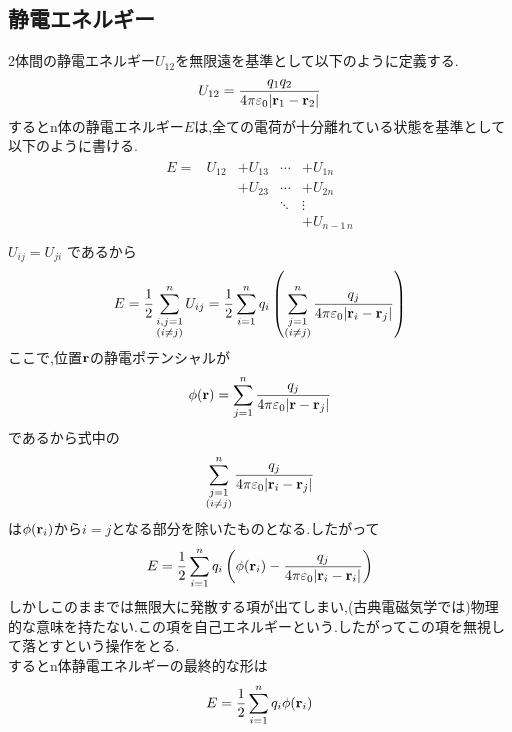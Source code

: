 \documentclass{jsarticle}
\begin{document}
\subsection{静電エネルギー}
2体間の静電エネルギー$U_{12}$を無限遠を基準として以下のように定義する.
\begin{eqnarray*}
U_{12} = \frac{q_1q_2}{4 \pi \varepsilon_0 |{\bf r}_1-{\bf r}_2|}
\end{eqnarray*}
するとn体の静電エネルギー$E$は,全ての電荷が十分離れている状態を基準として以下のように書ける.
\begin{eqnarray*}
\begin{array}{ccccc}
E=& U_{12} & +U_{13} & \cdots & +U_{1n} \\
\ & \ & +U_{23} & \cdots & + U_{2n} \\
\ & \ & \ & \ddots & \vdots \\
\ & \ & \ & \ & + U_{n-1\, n} \\
\end{array}
\end{eqnarray*}
$U_{ij} = U_{ji}$ であるから
\begin{eqnarray*}
E = \frac{1}{2} \sum_{ \substack{i,j = 1 \\ (i \neq j)} }^{n} U_{ij} = \frac{1}{2} \sum_{i = 1}^{n} q_i \left( \sum_{ \substack{j = 1 \\ (i \neq j)} }^{n}
\frac{q_j}{4 \pi \varepsilon_0 |{\bf r}_i-{\bf r}_j|} \right)
\end{eqnarray*}
ここで,位置${\bf r}$の静電ポテンシャルが
\begin{eqnarray*}
\phi({\bf r}) = \sum_{j=1}^{n} \frac{q_j}{4 \pi \varepsilon_0 |{\bf r}-{\bf r}_j|}
\end{eqnarray*}
であるから式中の
\begin{eqnarray*}
\sum_{ \substack{j = 1 \\ (i \neq j)} }^{n}
\frac{q_j}{4 \pi \varepsilon_0 |{\bf r}_i-{\bf r}_j|}
\end{eqnarray*}
は$\phi({\bf r}_i)$から$i=j$となる部分を除いたものとなる.したがって
\begin{eqnarray*}
E = \frac{1}{2} \sum_{i = 1}^{n} q_i \left( \phi({\bf r}_i) - \frac{q_j}{4 \pi \varepsilon_0 |{\bf r}_i-{\bf r}_i|} \right)
\end{eqnarray*}
しかしこのままでは無限大に発散する項が出てしまい,(古典電磁気学では)物理的な意味を持たない.この項を自己エネルギーという.したがってこの項を無視して落とすという操作をとる. \\
するとn体静電エネルギーの最終的な形は
\begin{eqnarray}
E = \frac{1}{2} \sum_{i = 1}^{n} q_i \phi ({\bf r}_i)
\end{eqnarray}
\end{document}
